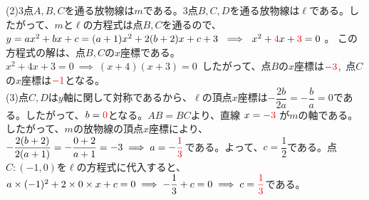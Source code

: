 \documentclass[dvipdfmx,twoside]{jsarticle}
\begin{document}
\begin{CJK}{UTF8}{ipxm}
\noindent
(2)\quad 3点$A,B,C$を通る放物線は$m$である。3点$B,C,D$を通る放物線は$\ell$である。したがって、$m$と$\ell$の方程式は点$B,C$を通るので、$y=ax^2+bx+c=(a+1)x^2+2(b+2)x+c+3\ \implies\ x^2+{\color{red}4}x+{\color{red}3}=0$ 。
この方程式の解は、点$B,C$の$x$座標である。$x^2+4x+3=0\ \implies\ (x+4)(x+3)=0$\ したがって、点$B$の$x$座標は$\color{red}-3$,\ 点$C$の$x$座標は$\color{red}-1$となる。\\

\noindent
(3)\quad 点$C,D$は$y$軸に関して対称であるから、$\ell$の頂点$x$座標は$-\dfrac{2b}{2a}=-\dfrac{b}{a}=0$である。したがって、$b=\color{red}{0}$となる。$AB=BC$より、直線 $x=\color{red}{-3}$ が$m$の軸である。したがって、$m$の放物線の頂点$x$座標により、$-\dfrac{2(b+2)}{2(a+1)}=-\dfrac{0+2}{a+1}=-3 \implies a=-\color{red}{\dfrac{1}{3}}$である。よって、$c=\dfrac{1}{2}$である。点$C:(-1,0)$を$\ell$の方程式に代入すると、 $a\times (-1)^2+2\times 0\times x+c=0 \implies -\dfrac{1}{3}+c=0 \implies c=\color{red}{\dfrac{1}{3}}$である。

\end{CJK}
\end{document}
